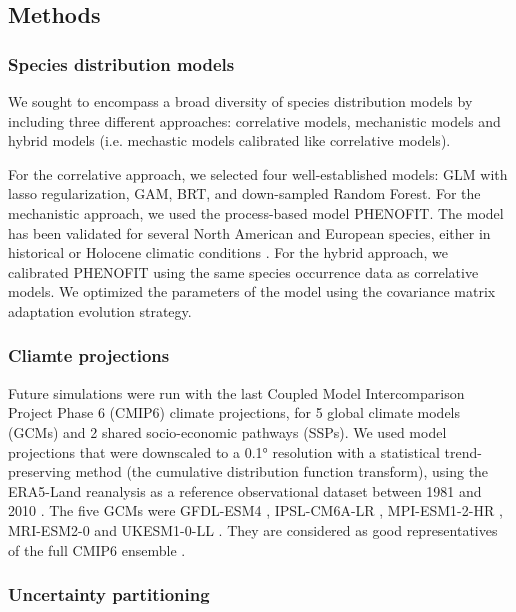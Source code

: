 \documentclass[11pt,letter]{article}
\begin{document}
\subsection*{Methods}

\subsubsection*{Species distribution models}

We sought to encompass a broad diversity of species distribution models by including three different approaches: correlative models, mechanistic models and hybrid models (i.e. mechastic models calibrated like correlative models\citep{VanderMeersch2023}).

For the correlative approach, we selected four well-established models\citep{Valavi2022}: GLM with lasso regularization, GAM, BRT, and down-sampled Random Forest. For the mechanistic approach, we used the process-based model PHENOFIT. The model has been validated for several North American and European species, either in historical or Holocene climatic conditions \citep{Morin2007, Saltre2013, Duputie2015, Gauzere2020, VanderMeersch2024}. For the hybrid approach, we calibrated PHENOFIT using the same species occurrence data as correlative models\citep{VanderMeersch2023}. We optimized the parameters of the model using the covariance matrix adaptation evolution strategy\citep{Hansen2001}.

\subsubsection*{Cliamte projections}

Future simulations were run with the last Coupled Model Intercomparison Project Phase 6 (CMIP6) climate  projections, for 5 global climate models (GCMs) and 2 shared socio-economic pathways (SSPs). 
We used model projections that were downscaled to a 0.1° resolution with a statistical trend-preserving method (the cumulative distribution function transform), using the ERA5-Land reanalysis as a reference observational dataset between 1981 and 2010 \citep{Noel2022}. The five GCMs were GFDL-ESM4 \citep{Dunne2020}, IPSL-CM6A-LR \citep{Lurton2020}, MPI-ESM1-2-HR \citep{Mueller2018}, MRI-ESM2-0 \citep{Yukimoto2019} and UKESM1-0-LL \citep{Sellar2020}. They are considered as good representatives of the full CMIP6 ensemble \citep{Noel2022}. 

\subsubsection*{Uncertainty partitioning}
\end{document}
